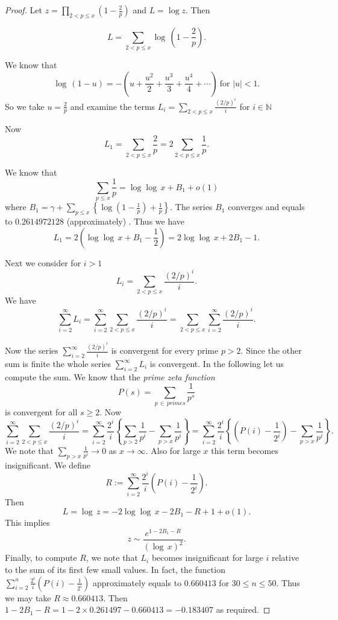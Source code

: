 \documentclass[11pt]{article}
\theoremstyle{definition}
\theoremstyle{remark}
\numberwithin{equation}{section}
\newcommand{\Nat}{\mathbb{N}}
\begin{document}
\begin{proof}
Let $z=\prod\limits_{2<p\leq x} \left( 1-\frac{2}{p}\right)$ and $L=\log z$. Then

$${L=\sum\limits_{2<p\leq x} \log\, \left( 1-\frac{2}{p}\right)}.$$

\noindent
We know that
$$\log\, (1-u) = -\left( u + \frac{u^2}{2} + \frac{u^3}{3} + \frac{u^4}{4} +\cdots\right)\ \text{for } |u|<1.$$
So we take $u=\frac{2}{p}$ and examine the terms $\displaystyle{L_i=\sum\limits_{2<p\leq x} \frac{(2/p)^i}{i}}$ for $i\in\Nat$

\vspace{1em}
\noindent
Now
$$L_1=\sum\limits_{2<p\leq x} \frac{2}{p} = 2 \sum\limits_{2<p\leq x} \frac{1}{p}.$$

\noindent
We know that 
$$\sum\limits_{p\leq x} \frac{1}{p} = \log\log\, x+B_1+o(1)$$
where $B_1=\gamma +\sum\limits_{p\leq x} \left\{\log\left(1-\frac{1}{p}\right) + \frac{1}{p}\right\}$. The series $B_1$ converges and equals to $0.2614972128$ (approximately) \cite{HWR}. Thus we have 
$$L_1= 2 \left(\log\log\, x + B_1 - \frac{1}{2}\right) = 2\log\log\, x+2B_1-1.$$

\noindent
Next we consider for $i>1$
$$L_i=\sum\limits_{2<p\leq x} \frac{(2/p)^i}{i}.$$
We have $$\sum\limits_{i=2}^{\infty} L_i = \sum\limits_{i=2}^{\infty} \sum\limits_{2<p\leq x} \frac{(2/p)^i}{i} = \sum\limits_{2<p\leq x} \sum\limits_{i=2}^{\infty} \frac{(2/p)^i}{i}.$$

\noindent
Now the series $\sum\limits_{i=2}^{\infty} \frac{(2/p)^i}{i}$ is convergent for every prime $p>2$. Since the other sum is finite the whole series $\sum\limits_{i=2}^{\infty} L_i$ is convergent. In the following let us compute the sum. We know that the {\em prime zeta function} 
$$P(s)= \sum\limits_{p\,\in\, primes} \frac{1}{p^s}$$
is convergent for all $s\geq 2$. Now
$$\sum\limits_{i=2}^{\infty} \sum\limits_{2<p\leq x} \frac{(2/p)^i}{i} = \sum\limits_{i=2}^{\infty} \frac{2^i}{i}\left\{\sum\limits_{p>2} \frac{1}{p^i}-\sum\limits_{p>x} \frac{1}{p^i}\right\} = \sum\limits_{i=2}^{\infty} \frac{2^i}{i}\left\{\left(P(i)-\frac{1}{2^i}\right)-\sum\limits_{p>x} \frac{1}{p^i}\right\}.$$
We note that $\sum\limits_{p>x} \frac{1}{p^i}\rightarrow 0$ as $x\rightarrow \infty$. Also for large $x$ this term becomes insignificant. We define 
$$R:=\sum\limits_{i=2}^{\infty} \frac{2^i}{i}\left(P(i)-\frac{1}{2^i}\right).$$
Then $$L=\log\, z=- 2\log\log\, x-2B_1-R+1+o(1).$$
This implies 
$$z\sim \frac{e^{1-2B_1-R}}{(\log\, x)^2}.$$
Finally, to compute $R$, we note that $L_i$ becomes insignificant for large $i$ relative to the sum of its first few small values. In fact, the function $\displaystyle{\sum\limits_{i=2}^n \frac{2^i}{i} \left(P(i)-\frac{1}{2^i}\right)}$ approximately equals to $0.660413$ for $30\leq n\leq 50$. Thus we may take $R\approx 0.660413$. Then $1-2B_1-R=1-2\times 0.261497-0.660413=-0.183407$ as required.
\end{proof}
\end{document}
